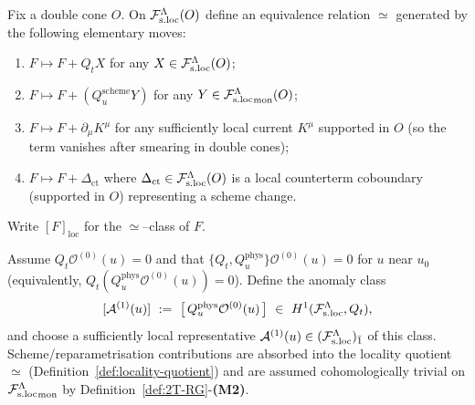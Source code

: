 \begin{definition}
\label{def:locality-quotient}
Fix a double cone $O$.  On $\mathcal F_{\mathrm{s.loc}}^\Lambda(O)$ define an equivalence relation $\simeq$
generated by the following elementary moves:
\begin{enumerate}[label=\textnormal{(\alph*)},leftmargin=*,itemsep=0.2em]
\item $F \mapsto F+Q_t X$ for any $X\in\mathcal F_{\mathrm{s.loc}}^\Lambda(O)$;
\item $F \mapsto F+(Q_u^{\mathrm{scheme}}Y)$ for any $Y\in{\mathcal F_{\mathrm{s.loc}}^\Lambda}_{\mathrm{mon}}(O)$;
\item $F \mapsto F+\partial_\mu K^\mu$ for any sufficiently local current $K^\mu$
  supported in $O$ (so the term vanishes after smearing in double cones);
\item $F \mapsto F+\Delta_{\mathrm{ct}}$ where $\Delta_{\mathrm{ct}}\in\mathcal F_{\mathrm{s.loc}}^\Lambda(O)$
  is a local counterterm coboundary (supported in $O$) representing a scheme change.
\end{enumerate}
Write $[F]_{\mathrm{loc}}$ for the $\simeq$--class of $F$.
\end{definition}

\begin{definition}
\label{def:A1-class}
Assume $Q_t\mathcal O^{(0)}(u)=0$ and that $\{Q_t,Q_u^{\mathrm{phys}}\}\mathcal O^{(0)}(u)=0$
for $u$ near $u_0$ (equivalently, $Q_t(Q_u^{\mathrm{phys}}\mathcal O^{(0)}(u))=0$).
Define the anomaly class
\[
[\mathcal A^{(1)}(u)]\ :=\ \big[\,Q_u^{\mathrm{phys}}\mathcal O^{(0)}(u)\,\big]\ \in\ H^1(\Fsloc,Q_t),
\]
and choose a sufficiently local representative $\mathcal A^{(1)}(u)\in(\mathcal F_{\mathrm{s.loc}}^\Lambda)_{\bar 1}$
of this class.  Scheme/reparametrisation contributions are absorbed into the locality quotient
$\simeq$ (Definition~\ref{def:locality-quotient}) and are assumed cohomologically
trivial on ${\mathcal F_{\mathrm{s.loc}}^\Lambda}_{\mathrm{mon}}$ by Definition~\ref{def:2T-RG}-\textbf{(M2)}.
\end{definition}

